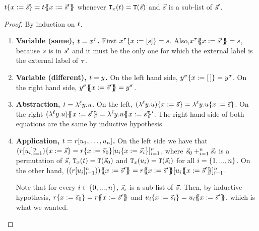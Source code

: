 \begin{lemma}
$t\{x := \vec{s}\} = t\{\!\!\{x := \vec{s}'\}\!\!\}$
whenever $\mathtt{T}_{x}(t) = \mathtt{T}(\vec{s})$ and $\vec{s}$ is a sub-list of $\vec{s}'$.
\end{lemma}
\begin{proof}
By induction on $t$.
\begin{enumerate}
\item {\bf Variable (same), $t = x^\tau$.}
  First $x^\tau\{x := [s]\} = s$.
  Also,$x^\tau\{\!\!\{x := \vec{s}'\}\!\!\} = s$,
  because $s$ is in $\vec{s}'$ and it must be the only one for which the external label is the external label of $\tau$.
\item {\bf Variable (different), $t = y$.}
  On the left hand side, $y^\sigma\{x := [\,]\} = y^\sigma$.
  On the right hand side, $y^\sigma\{\!\!\{x := \vec{s}'\}\!\!\} = y^\sigma$.
\item {\bf Abstraction, $t = \lambda^{\ell} y. u$.}
  On the left, $(\lambda^{\ell} y. u)\{x := \vec{s}\} = \lambda^{\ell} y. u\{x := \vec{s}\}$.
  On the right $(\lamp{\lab}{\vartwo}{\tmthree})\sub{\var}{\ls{\tmtwo}'} = \lamp{\lab}{\vartwo}{\tmthree\sub{\var}{\ls{\tmtwo}}'}$.
  The right-hand side of both equations are the same by inductive hypothesis.
\item {\bf Application, $t = r [u_1, \hdots, u_n]$.}
  On the left side we have that
    $(r [u_i]_{i=1}^n)\{x := \vec{s}\} =
      r\{x := \vec{s}_0\} [u_i\{x := \vec{s}_i\}]_{i=1}^n$, where
      $\vec{s}_0 +_{i=1}^{n} \vec{s}_i$ is a permutation of $\vec{s}$,
      $\mathtt{T}_{x}(t) = \mathtt{T}(\vec{s}_0)$ and
      $\mathtt{T}_{x}(u_i) = \mathtt{T}(\vec{s}_i)$ for all $i = \{1,...,n\}$.
  On the other hand, $((\tmfour [\tmthree_i]_{i=1}^n))\sub{\var}{\ls{\tmtwo}'} =
      \tmfour\sub{\var}{\ls{\tmtwo}'} [\tmthree_i\sub{\var}{\ls{\tmtwo}'}]_{i=1}^n$.

  Note that for every $i \in \{0, ..., n\}$, $\vec{s}_i$ is a sub-list of $\vec{s}$.
  Then, by inductive hypothesis, $r\{x := \vec{s}_0\} = r\{\!\!\{x := \vec{s}'\}\!\!\}$
  and $u_i\{x := \vec{s}_i\} = u_i\{\!\!\{x := \vec{s}'\}\!\!\}$, which is what we wanted.
\end{enumerate}
\end{proof}

